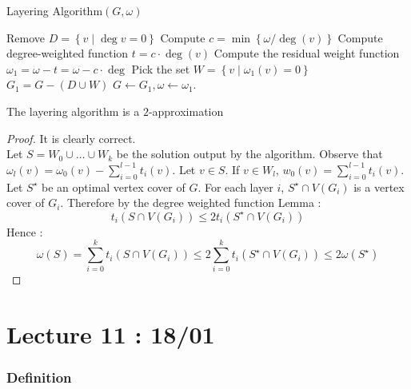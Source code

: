 \documentclass[12pt]{cours}
\begin{document}
\begin{algorithm}
    \caption{Layering Algorithm$(G, \omega)$}
    \begin{algorithmic}
            \State Remove $D = \left\{v \mid \deg v = 0\right\}$
            \State Compute $c = \min \left\{\omega/\deg(v)\right\}$
            \State Compute degree-weighted function $t = c \cdot \deg(v)$
            \State Compute the residual weight function $\omega_{1} = \omega - t = \omega- c \cdot \deg$ 
            \State Pick the set $W = \left\{v \mid \omega_{1}(v) = 0\right\}$
            \State $G_{1} = G - \left(D \cup W\right)$
            \State $G \gets G_{1}, \omega \gets \omega_{1}$.
        \EndWhile
    \end{algorithmic}
\end{algorithm}

\begin{theorem}
    The layering algorithm is a $2$-approximation
\end{theorem}
\begin{proof}
    It is clearly correct.\\
    Let $S = W_{0} \cup \ldots \cup W_{k}$ be the solution output by the algorithm. Observe that $\omega_{l}(v) = \omega_{0}(v) - \sum_{i = 0}^{l- 1}t_{i}(v)$. Let $v \in S$. If $v \in W_{l}$, $w_{0}(v) = \sum_{i = 0}^{l - 1}t_{i}(v)$.\\
    Let $S^{\star}$ be an optimal vertex cover of $G$. For each layer $i$, $S^{\star} \cap V\left(G_{i}\right)$ is a vertex cover of $G_{i}$. Therefore by the degree weighted function Lemma : 
    \[
        t_{i}\left(S\cap V(G_{i})\right) \leq 2 t_{i}\left(S^{\star} \cap V(G_{i})\right)
    \]
    Hence : 
    \[
        \omega(S) = \sum_{i = 0}^{k} t_{i}\left(S \cap V(G_{i})\right) \leq 2 \sum_{i = 0}^{k} t_{i}(S^{\star} \cap V(G_{i})) \leq 2 \omega(S^{\star})
    \]
\end{proof}
\part[Linear Programming]{Lecture 11 : 18/01}
\section{Definition}
\end{document}
